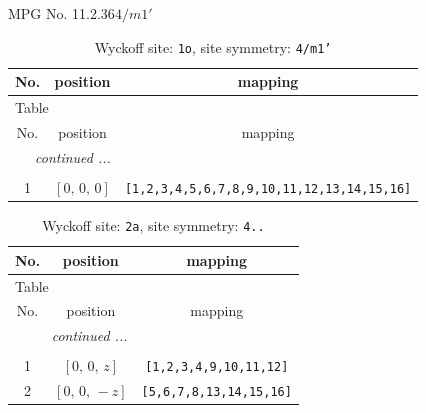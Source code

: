 \documentclass[fleqn,8pt]{jsarticle}
\begin{document}
\setcounter{MaxMatrixCols}{32}

\renewcommand{\tablename}{Table~}
\renewcommand{\figurename}{Figure~}
\begin{center}
\LARGE
MPG No. 11.2.36\quad$4/m1'$
\end{center}
\renewcommand{\arraystretch}{1.2}
\begin{longtable}{ccc}
\caption{Wyckoff site: {\tt 1o}, site symmetry: {\tt 4/m1'}}
 \\
 \hline \hline
No. & position & mapping \\ \hline \endfirsthead

\multicolumn{2}{l}{\tablename\ \thetable{}} \\
 \hline \hline
No. & position & mapping \\ \hline \endhead

 \hline \hline
\multicolumn{2}{r}{\footnotesize\it continued ...} \\ \endfoot

 \hline \hline
\multicolumn{2}{r}{} \\ \endlastfoot

1 & $\left[ 0,\, 0,\, 0 \right]$ & {\tt [1,2,3,4,5,6,7,8,9,10,11,12,13,14,15,16]} \\
\end{longtable}
\renewcommand{\arraystretch}{1.2}
\begin{longtable}{ccc}
\caption{Wyckoff site: {\tt 2a}, site symmetry: {\tt 4..}}
 \\
 \hline \hline
No. & position & mapping \\ \hline \endfirsthead

\multicolumn{2}{l}{\tablename\ \thetable{}} \\
 \hline \hline
No. & position & mapping \\ \hline \endhead

 \hline \hline
\multicolumn{2}{r}{\footnotesize\it continued ...} \\ \endfoot

 \hline \hline
\multicolumn{2}{r}{} \\ \endlastfoot

1 & $\left[ 0,\, 0,\, z \right]$ & {\tt [1,2,3,4,9,10,11,12]} \\ \hline
2 & $\left[ 0,\, 0,\, - z \right]$ & {\tt [5,6,7,8,13,14,15,16]} \\
\end{longtable}
\renewcommand{\arraystretch}{1.2}
\end{document}
